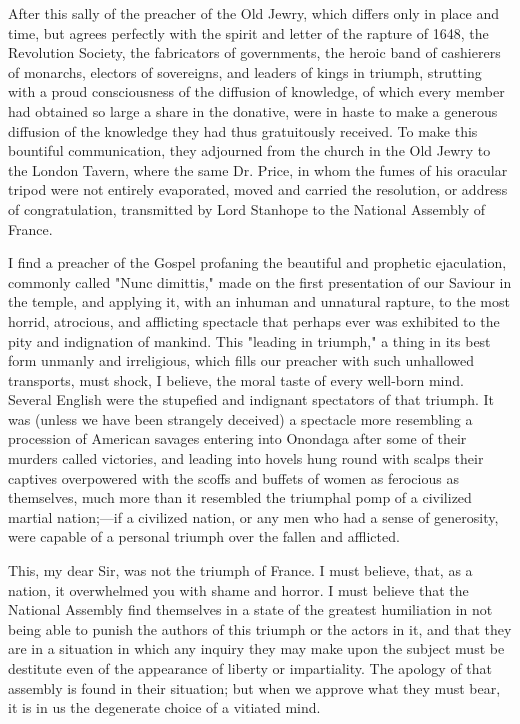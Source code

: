 After this sally of the preacher of the Old Jewry, which differs only in place and time, but agrees perfectly with the spirit and letter of the rapture of 1648, the Revolution Society, the fabricators of governments, the heroic band of cashierers of monarchs, electors of sovereigns, and leaders of kings in triumph, strutting with a proud consciousness of the diffusion of knowledge, of which every member had obtained so large a share in the donative, were in haste to make a generous diffusion of the knowledge they had thus gratuitously received. To make this bountiful communication, they adjourned from the church in the Old Jewry to the London Tavern, where the same Dr. Price, in whom the fumes of his oracular tripod were not entirely evaporated, moved and carried the resolution, or address of congratulation, transmitted by Lord Stanhope to the National Assembly of France.

I find a preacher of the Gospel profaning the beautiful and prophetic ejaculation, commonly called "Nunc dimittis," made on the first presentation of our Saviour in the temple, and applying it, with an inhuman and unnatural rapture, to the most horrid, atrocious, and afflicting spectacle that perhaps ever was exhibited to the pity and indignation of mankind. This "leading in triumph," a thing in its best form unmanly and irreligious, which fills our preacher with such unhallowed transports, must shock, I believe, the moral taste of every well-born mind. Several English were the stupefied and indignant spectators of that triumph. It was (unless we have been strangely deceived) a spectacle more resembling a procession of American savages entering into Onondaga after some of their murders called victories, and leading into hovels hung round with scalps their captives overpowered with the scoffs and buffets of women as ferocious as themselves, much more than it resembled the triumphal pomp of a civilized martial nation;—if a civilized nation, or any men who had a sense of generosity, were capable of a personal triumph over the fallen and afflicted.

This, my dear Sir, was not the triumph of France. I must believe, that, as a nation, it overwhelmed you with shame and horror. I must believe that the National Assembly find themselves in a state of the greatest humiliation in not being able to punish the authors of this triumph or the actors in it, and that they are in a situation in which any inquiry they may make upon the subject must be destitute even of the appearance of liberty or impartiality. The apology of that assembly is found in their situation; but when we approve what they must bear, it is in us the degenerate choice of a vitiated mind.

